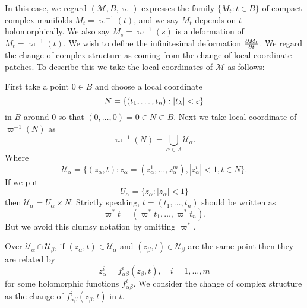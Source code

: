 \documentclass[12pt]{article}
\begin{document}
In this case, we regard \((\mathscr{M},B,\varpi)\) expresses the family
\(\{M_t:t\in B\}\) of compact complex manifolds \(M_t=\varpi^{-1}(t)\), and we
say \(M_t\) depends on \(t\) holomorphically. We also say \(M_s=\varpi^{-1}(s)\)
is a deformation of \(M_t=\varpi^{-1}(t)\). We wish to define the infinitesimal
deformation \(\pdv{M_t}{t}\). We regard the change of complex structure as
coming from the change of local coordinate patches. To describe this we take
the local coordinates of \(\mathscr{M}\) as follows:

First take a point \(0\in B\) and choose a local coordinate \[
  N=\{(t_1,\ldots,t_n):|t_\lambda|<\varepsilon\}
\] in \(B\) around \(0\) so that \((0,\ldots,0)=0\in N\subset B\). Next we take
local coordinate of \(\varpi^{-1}(N)\) as \[
\varpi^{-1}(N)=\bigcup_{\alpha\in A}\mathcal{U}_\alpha
.\] Where \[
  \mathcal{U}_{\alpha}=\{(z_\alpha,t):z_\alpha=(z^1_\alpha,\ldots,z^m_\alpha),
  |z^i_\alpha|<1,t\in N\}
.\] If we put \[
  U_\alpha=\{z_\alpha:|z_\alpha|<1\}
\] then \(\mathcal{U}_\alpha=U_\alpha\times N\). Strictly speaking,
\(t=(t_1,\ldots,t_n)\) should be written as \[
  \varpi^* t=(\varpi^*t_1,\ldots,\varpi^*t_n)
.\] But we avoid this clumsy notation by omitting \(\varpi^*\).

Over \(\mathcal{U}_\alpha\cap \mathcal{U}_\beta\), if \((z_\alpha,t)\in
\mathcal{U}_\alpha\) and \((z_\beta,t)\in\mathcal{U}_\beta\) are the same point
then they are related by \[
  z_\alpha^i=f_{\alpha\beta}^i(z_\beta,t),\quad i=1,\ldots,m
\] for some holomorphic functions \(f_{\alpha\beta}^i\). We consider the change
of complex structure as the change of \(f_{\alpha\beta}^i(z_\beta,t)\) in \(t\).
\end{document}
